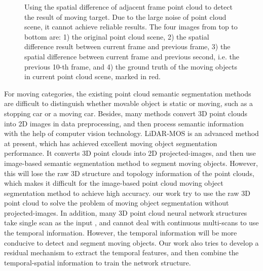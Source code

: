 \documentclass[lettersize,journal]{IEEEtran}
\begin{document}
\begin{figure}[t]
\centering
{}
\caption{Using the spatial difference of adjacent frame point cloud to detect the result of moving target. Due to the large noise of point cloud scene, it cannot achieve reliable results. The four images from top to bottom are: 1) the original point cloud scene, 2) the spatial difference result between current frame and previous frame, 3) the spatial difference between current frame and previous second, i.e. the previous 10-th frame, and 4) the ground truth of the moving objects in current point cloud scene, marked in red.}
\label{fig_1.2}
\end{figure}

For moving categories, the existing point cloud semantic segmentation methods are difficult to distinguish whether movable object is static or moving, such as a stopping car or a moving car. Besides, many methods convert 3D point clouds into 2D images in data preprocessing, and then process semantic information with the help of computer vision technology. LiDAR-MOS \cite{chen2021moving} is an advanced method at present, which has achieved excellent moving object segmentation performance. It converts 3D point clouds into 2D projected-images, and then use image-based semantic segmentation method to segment moving objects. However, this will lose the raw 3D structure and topology information of the point clouds, which makes it difficult for the image-based point cloud moving object segmentation method to achieve high accuracy. our work try to use the raw 3D point cloud to solve the problem of moving object segmentation without projected-images. In addition, many 3D point cloud neural network structures take single scan as the input \cite{zhu2021cylindrical}, and cannot deal with continuous multi-scans to use the temporal information. However, the temporal information will be more conducive to detect and segment moving objects. Our work also tries to develop a residual mechanism to extract the temporal features, and then combine the temporal-spatial information to train the network structure.
\end{document}
